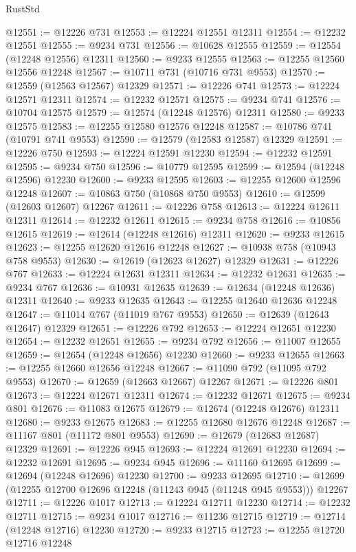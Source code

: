 \begin{lexlean}{RustStd}
\begin{coremodule}
@12551 := @12226 @731
@12553 := @12224 @12551 @12311
@12554 := @12232 @12551
@12555 := @9234 @731
@12556 := @10628 @12555
@12559 := @12554 (@12248 @12556) @12311
@12560 := @9233 @12555
@12563 := @12255 @12560 @12556 @12248
@12567 := @10711 @731 (@10716 @731 @9553)
@12570 := @12559 (@12563 @12567) @12329
@12571 := @12226 @741
@12573 := @12224 @12571 @12311
@12574 := @12232 @12571
@12575 := @9234 @741
@12576 := @10704 @12575
@12579 := @12574 (@12248 @12576) @12311
@12580 := @9233 @12575
@12583 := @12255 @12580 @12576 @12248
@12587 := @10786 @741 (@10791 @741 @9553)
@12590 := @12579 (@12583 @12587) @12329
@12591 := @12226 @750
@12593 := @12224 @12591 @12230
@12594 := @12232 @12591
@12595 := @9234 @750
@12596 := @10779 @12595
@12599 := @12594 (@12248 @12596) @12230
@12600 := @9233 @12595
@12603 := @12255 @12600 @12596 @12248
@12607 := @10863 @750 (@10868 @750 @9553)
@12610 := @12599 (@12603 @12607) @12267
@12611 := @12226 @758
@12613 := @12224 @12611 @12311
@12614 := @12232 @12611
@12615 := @9234 @758
@12616 := @10856 @12615
@12619 := @12614 (@12248 @12616) @12311
@12620 := @9233 @12615
@12623 := @12255 @12620 @12616 @12248
@12627 := @10938 @758 (@10943 @758 @9553)
@12630 := @12619 (@12623 @12627) @12329
@12631 := @12226 @767
@12633 := @12224 @12631 @12311
@12634 := @12232 @12631
@12635 := @9234 @767
@12636 := @10931 @12635
@12639 := @12634 (@12248 @12636) @12311
@12640 := @9233 @12635
@12643 := @12255 @12640 @12636 @12248
@12647 := @11014 @767 (@11019 @767 @9553)
@12650 := @12639 (@12643 @12647) @12329
@12651 := @12226 @792
@12653 := @12224 @12651 @12230
@12654 := @12232 @12651
@12655 := @9234 @792
@12656 := @11007 @12655
@12659 := @12654 (@12248 @12656) @12230
@12660 := @9233 @12655
@12663 := @12255 @12660 @12656 @12248
@12667 := @11090 @792 (@11095 @792 @9553)
@12670 := @12659 (@12663 @12667) @12267
@12671 := @12226 @801
@12673 := @12224 @12671 @12311
@12674 := @12232 @12671
@12675 := @9234 @801
@12676 := @11083 @12675
@12679 := @12674 (@12248 @12676) @12311
@12680 := @9233 @12675
@12683 := @12255 @12680 @12676 @12248
@12687 := @11167 @801 (@11172 @801 @9553)
@12690 := @12679 (@12683 @12687) @12329
@12691 := @12226 @945
@12693 := @12224 @12691 @12230
@12694 := @12232 @12691
@12695 := @9234 @945
@12696 := @11160 @12695
@12699 := @12694 (@12248 @12696) @12230
@12700 := @9233 @12695
@12710 := @12699 (@12255 @12700 @12696 @12248 (@11243 @945 (@11248 @945 @9553))) @12267
@12711 := @12226 @1017
@12713 := @12224 @12711 @12230
@12714 := @12232 @12711
@12715 := @9234 @1017
@12716 := @11236 @12715
@12719 := @12714 (@12248 @12716) @12230
@12720 := @9233 @12715
@12723 := @12255 @12720 @12716 @12248

\end{coremodule}
\end{lexlean}
